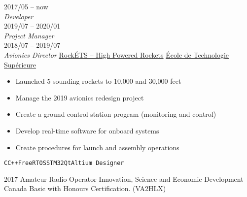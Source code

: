 \documentclass[9pt]{developercv} %
\begin{document}
\begin{minipage}[t]{0.8\textwidth}

\begin{entrylist}
	\entry
		{2017/05 -- now\\{\small\emph{Developer}}\\2019/07 -- 2020/01\\{\small\emph{Project Manager}}\\2018/07 -- 2019/07\\{\small\emph{Avionics Director}}}
		{\href{https://clubrockets.ca/en/}{RockÉTS -- High Powered Rockets}}
		{\href{https://clubrockets.ca/en/}{École de Technologie Supérieure}}
		{
			\vspace{-14pt}
			\begin{itemize}
				\renewcommand{\labelitemi}{\raisebox{.45ex}{\rule{.6ex}{.6ex}}}
				\setlength\itemsep{-1pt}
				\item Launched 5 sounding rockets to 10,000 and 30,000 feet
				\item Manage the 2019 avionics redesign project
				\item Create a ground control station program (monitoring and control)
				\item Develop real-time software for onboard systems
				\item Create procedures for launch and assembly operations
			\end{itemize}
			\vspace{-4pt}
			\texttt{C}\slashsep\texttt{C++}\slashsep\texttt{FreeRTOS}\slashsep\texttt{STM32}\slashsep\texttt{Qt}\slashsep\texttt{Altium Designer}
		}
	\end{entrylist}



	\begin{entrylist}
		\entry
			{2017}
			{Amateur Radio Operator}
			{Innovation, Science and Economic Development Canada}
			{
				Basic with Honours Certification. (VA2HLX)
			}
	\end{entrylist}
\end{minipage}
\begin{minipage}[t]{0.02\textwidth}
	\hfill
\end{minipage}
\end{document}
